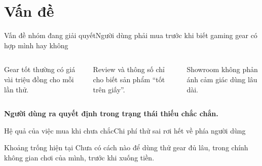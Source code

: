 \section{Vấn đề}

\begin{frame}{Vấn đề nhóm đang giải quyết}{Người dùng phải mua trước khi biết gaming gear có hợp mình hay không}
  \vspace{.6em}
  \begin{columns}[T,onlytextwidth]
      \par\vspace{.45em}
      Gear tốt thường có giá vài triệu đồng cho mỗi lần thử.
      \par\vspace{.45em}
      Review và thông số chỉ cho biết sản phẩm ``tốt trên giấy''.
      \par\vspace{.45em}
      Showroom không phản ánh cảm giác dùng lâu dài.
  \end{columns}
  \vfill
  \centering\textcolor{mutuxOrange}{\textbf{Người dùng ra quyết định trong trạng thái thiếu chắc chắn.}}
\end{frame}

\begin{frame}{Hệ quả của việc mua khi chưa chắc}{Chi phí thử sai rơi hết về phía người dùng}
  \vspace{.4em}
  \centering
  \vfill
  \begin{alertblock}{Khoảng trống hiện tại}
    Chưa có cách nào để dùng thử gear đủ lâu, trong chính không gian chơi của mình, trước khi xuống tiền.
  \end{alertblock}
\end{frame}
